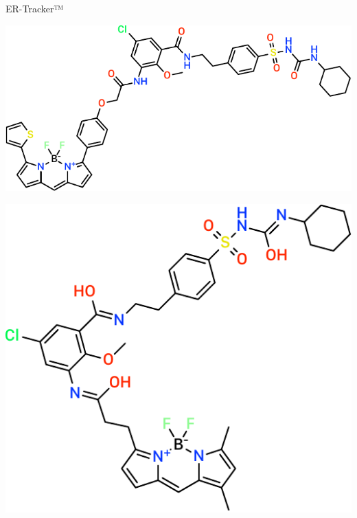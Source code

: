 \documentclass[%
spanish,
mexico]{beamer}
\begin{document}
{
\begin{frame}{ER-Tracker™}
	\begin{scheme}[H]
		\centering
		\begin{subscheme}{0.45\linewidth}
			\includegraphics[width=\linewidth]{./Figuras/ER-Tracker_Blue.pdf}
			\caption{ER-Tracker™ Blue}
			\label{ER-Tracker_Blue}
		\end{subscheme}
		\hfill
		\begin{subscheme}{0.45\linewidth}
			\includegraphics[width=\linewidth]{./Figuras/ER-Tracker_Green.pdf}
			\caption{ER-Tracker™ Green}
			\label{ER-Tracker_Green}
		\end{subscheme}
		\caption[ER-Trackers™]{\textit{Los ER-Tracker™ Green} y \textit{ER-Tracker™ Red} de Thermo Fischer Scientific™ son \gls{BODIPY} comerciales utilizados como agentes para la tinción celular.}
		\label{ER-Trackers}
	\end{scheme}
\end{frame}
}
\end{document}
